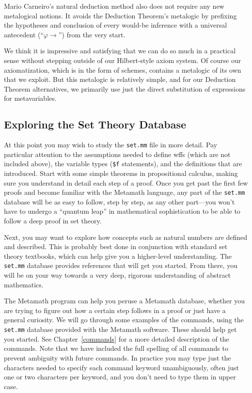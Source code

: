 Mario Carneiro's natural deduction
method also does not require any new metalogical
notions. It avoids the Deduction Theorem's metalogic by prefixing the
hypotheses and conclusion of every would-be inference with a universal
antecedent (``$\varphi \rightarrow$'') from the very start.

We think it is impressive and satisfying that we can do so much in a
practical sense without stepping outside of our Hilbert-style axiom system.
Of course our axiomatization, which is in the form of schemes,
contains a metalogic of its own that we exploit. But this metalogic
is relatively simple, and for our Deduction Theorem alternatives,
we primarily use just the direct substitution of expressions for
metavariables.

\begin{sloppy}
\section{Exploring the Set The\-o\-ry Data\-base}\label{exploring}
\end{sloppy}

At this point you may wish to study the \texttt{set.mm} file in more detail.  Pay particular
attention to the assumptions needed to define wffs (which are not included above), the variable types
(\texttt{\$f} statements), and the
definitions that are introduced.  Start with some simple theorems in
propositional calculus, making sure you understand in detail each step
of a proof.  Once you get past the first few proofs and become familiar
with the Metamath language, any part of the \texttt{set.mm} database
will be as easy to follow, step by step, as any other part---you won't
have to undergo a ``quantum leap'' in mathematical sophistication to be
able to follow a deep proof in set theory.

Next, you may want to explore how concepts such as natural numbers are
defined and described.  This is probably best done in conjunction with
standard set theory textbooks, which can help give you a higher-level
understanding.  The \texttt{set.mm} database provides references that will get
you started.  From there, you will be on your way towards a very deep,
rigorous understanding of abstract mathematics.

The Metamath program can help you peruse a Metamath data\-base,
wheth\-er you are trying to figure out how a certain step follows in a proof or
just have a general curiosity.  We will go through some examples of the
commands, using the \texttt{set.mm}
database provided with the Metamath software.  These should help get you
started.  See Chapter~\ref{commands} for a more detailed description of
the commands.  Note that we have included the full spelling of all commands to
prevent ambiguity with future commands.  In practice you may type just the
characters needed to specify each command keyword
unambiguously, often just one or two characters per keyword, and you don't
need to type them in upper
case.

